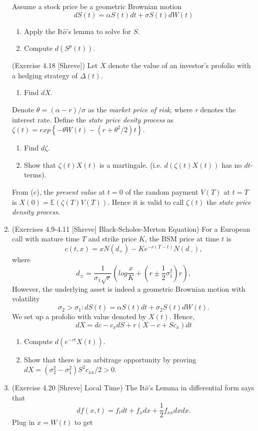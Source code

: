 \documentclass{article}
\begin{document}
\begin{enumerate}
Assume a stock price be a geometric Brownian motion \[dS(t) = \alpha S(t)dt + \sigma S(t)dW(t)\] 
\begin{enumerate}
\item Apply the It$\hat o$'s lemma to solve for $S$.
\item Compute $d(S^p(t))$.
\end{enumerate}
(Exercise 4.18 [Shreve]) Let $X$ denote the value of an investor's profolio with a hedging strategy of $\Delta(t)$.
\begin{enumerate}
\addtocounter{enumii}{2}
\item Find $dX$.
\end{enumerate}
Denote $\theta = (\alpha-r)/\sigma$ as the \emph{market price of risk}, where \emph{r} denotes the interest rate. Define the \emph{state price desity process} as 
$\zeta(t) = exp\left\{ -\theta W(t) - \left(r+ \theta^2/2\right)t \right\}$. 
\begin{enumerate}
\addtocounter{enumii}{3}
\item Find $d\zeta$.
\item Show that $\zeta(t)X(t)$ is a martingale. (i.e. $d(\zeta(t)X(t))$ has no $dt$-terms). 
\end{enumerate}
From (c), the \emph{present value} at $t=0$ of the random payment $V(T)$ at $t=T$ is $X(0)=\mathbb E(\zeta(T)V(T))$. Hence it is valid to call $\zeta(t)$ the \emph{state price density process}.
\item (Exercises 4.9-4.11 [Shreve] Black-Scholes-Merton Equation)
For a European call with mature time $T$ and strike price $K$, the BSM price at time $t$ is 
\[
c(t,x)=xN(d_+)-Ke^{-r(T-t)}N(d_-),
\]
where
\[
d_{\pm} = \frac1{\sigma_1\sqrt{r}} \left( log\frac xK + (r\pm\frac12\sigma_1^2)r\right),
\]
However, the underlying asset is indeed a geometric Brownian motion with volatility 
\[\sigma_2>\sigma_1: dS(t)=\alpha S(t)dt + \sigma_2S(t)dW(t).\]
We set up a profolio with value denoted by $X(t)$. Hence, 
\[
dX = dc - c_xdS + r(X-c+Sc_x)dt
\]
\begin{enumerate}
\item Compute $d(e^{-rt}X(t))$.
\item Show that there is an arbitrage opportunity by proving $dX = (\sigma_2^2-\sigma_1^2)S^2c_{xx}/2>0$.
\end{enumerate}
\item (Exercise 4.20 [Shreve] Local Time)
The It$\hat o$'s Lemma in differential form says that \[df(x,t)=f_tdt+f_xdx+\frac12f_{xx}dxdx.\] Plug in $x=W(t)$ to get 
\begin{equation} 

\end{equation}
\end{enumerate}
\end{document}
